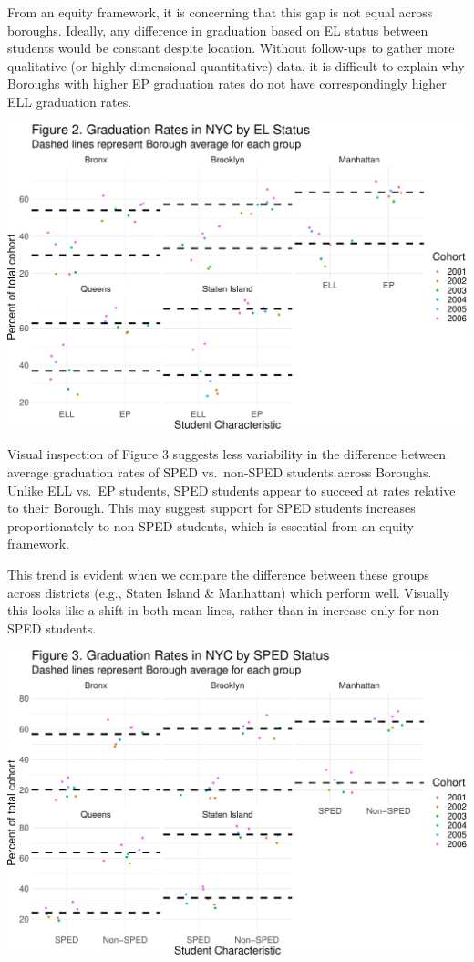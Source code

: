\documentclass[
  english,
  man, fleqn, noextraspace]{apa6}
\begin{document}
From an equity framework, it is concerning that this gap is not equal across boroughs. Ideally, any difference in graduation based on EL status between students would be constant despite location. Without follow-ups to gather more qualitative (or highly dimensional quantitative) data, it is difficult to explain why Boroughs with higher EP graduation rates do not have correspondingly higher ELL graduation rates.

\includegraphics{EDLD_651_Final_Project_Draft_files/figure-latex/graph_results_EL_graph-1.pdf}

Visual inspection of Figure 3 suggests less variability in the difference between average graduation rates of SPED vs.~non-SPED students across Boroughs. Unlike ELL vs.~EP students, SPED students appear to succeed at rates relative to their Borough. This may suggest support for SPED students increases proportionately to non-SPED students, which is essential from an equity framework.

This trend is evident when we compare the difference between these groups across districts (e.g., Staten Island \& Manhattan) which perform well. Visually this looks like a shift in both mean lines, rather than in increase only for non-SPED students.

\includegraphics{EDLD_651_Final_Project_Draft_files/figure-latex/graph_results_SPED-1.pdf}
\end{document}
